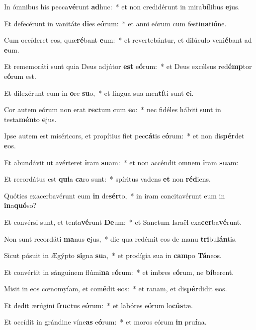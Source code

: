 \item In ómnibus his pecca\textbf{vé}runt \textbf{ad}huc:~* et non credidérunt in mira\textbf{bí}libus \textbf{e}jus.
\item Et defecérunt in vanitáte \textbf{di}es e\textbf{ó}rum:~* et anni eórum cum festi\textbf{na}ti\textbf{ó}ne.
\item Cum occíderet eos, quæ\textbf{ré}bant \textbf{e}um:~* et revertebántur, et dilúculo veni\textbf{é}bant ad \textbf{e}um.
\item Et rememoráti sunt quia Deus adjútor \textbf{est} e\textbf{ó}rum:~* et Deus excélsus red\textbf{émp}tor e\textbf{ó}rum est.
\item Et dilexérunt eum in \textbf{o}re \textbf{su}o,~* et lingua sua men\textbf{tí}ti sunt \textbf{e}i.
\item Cor autem eórum non erat \textbf{rec}tum cum \textbf{e}o:~* nec fidéles hábiti sunt in testa\textbf{mén}to \textbf{e}jus.
\item Ipse autem est miséricors, et propítius fiet pec\textbf{cá}tis e\textbf{ó}rum:~* et non dis\textbf{pér}det \textbf{e}os.
\item Et abundávit ut avérteret \textbf{i}ram \textbf{su}am:~* et non accéndit omnem \textbf{i}ram \textbf{su}am:
\item Et recordátus est \textbf{qui}a \textbf{ca}ro sunt:~* spíritus vadens \textbf{et} non \textbf{réd}iens.
\item Quóties exacerbavérunt eum \textbf{in} de\textbf{sér}to,~* in iram concitavérunt eum in \textbf{in}a\textbf{quó}so?
\item Et convérsi sunt, et tenta\textbf{vé}runt \textbf{De}um:~* et Sanctum Israël exa\textbf{cer}ba\textbf{vé}runt.
\item Non sunt recordáti \textbf{ma}nus \textbf{e}jus,~* die qua redémit eos de manu \textbf{tri}bu\textbf{lán}tis.
\item Sicut pósuit in Ægýpto \textbf{si}gna \textbf{su}a,~* et prodígia sua in \textbf{cam}po \textbf{Tá}neos.
\item Et convértit in sánguinem flúmi\textbf{na} e\textbf{ó}rum:~* et imbres e\textbf{ó}rum, ne \textbf{bí}berent.
\item Misit in eos cœnomyíam, et com\textbf{é}dit \textbf{e}os:~* et ranam, et dis\textbf{pér}didit \textbf{e}os.
\item Et dedit ærúgini \textbf{fruc}tus e\textbf{ó}rum:~* et labóres e\textbf{ó}rum lo\textbf{cús}tæ.
\item Et occídit in grándine víne\textbf{as} e\textbf{ó}rum:~* et moros eórum \textbf{in} pru\textbf{í}na.
